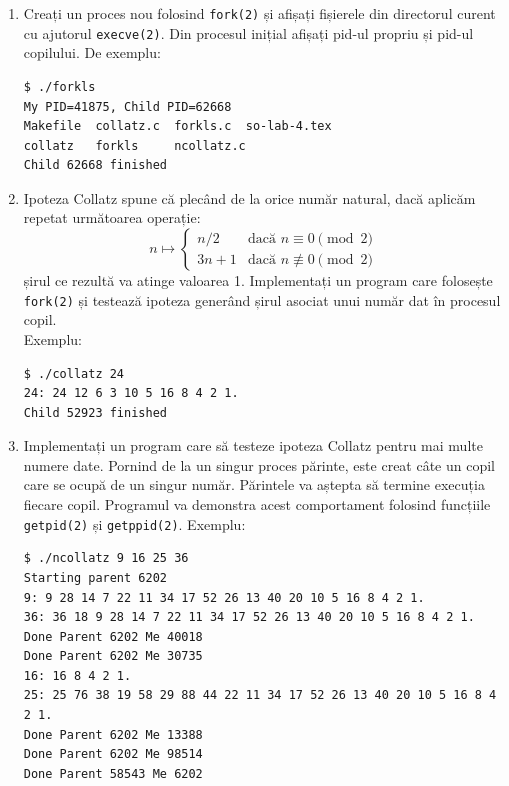 \documentclass[12pt,a4paper]{article}
\begin{document}
\begin{enumerate}

  \item Creați un proces nou folosind \texttt{fork(2)} 
  și afișați fișierele din directorul curent cu ajutorul \texttt{execve(2)}. 
  Din procesul inițial afișați pid-ul propriu și pid-ul copilului. 
  De exemplu:
\begin{lstlisting}[style=shell]
$ ./forkls
My PID=41875, Child PID=62668
Makefile  collatz.c  forkls.c  so-lab-4.tex
collatz   forkls     ncollatz.c
Child 62668 finished
\end{lstlisting}

  \item Ipoteza Collatz spune că plecând de la orice număr natural, 
  dacă aplicăm repetat următoarea operație:
    \[
      n \mapsto
      \begin{cases}
        n/2 & \text{dacă } n \equiv 0 \pmod{2} \\
        3n + 1 & \text{dacă } n \not\equiv 0 \pmod{2}
      \end{cases}
    \]
    șirul ce rezultă va atinge valoarea 1. 
    Implementați un program care folosește \texttt{fork(2)} 
    și testează ipoteza generând șirul asociat unui număr dat în procesul
    copil. \\

    Exemplu:
\begin{lstlisting}[style=shell]
$ ./collatz 24
24: 24 12 6 3 10 5 16 8 4 2 1.
Child 52923 finished
\end{lstlisting}

  \item Implementați un program care să testeze ipoteza Collatz 
  pentru mai multe numere date. 
  Pornind de la un singur proces părinte, 
  este creat câte un copil care se ocupă de un singur număr. 
  Părintele va aștepta să termine execuția fiecare copil. 
  Programul va demonstra acest comportament folosind funcțiile 
  \texttt{getpid(2)} și \texttt{getppid(2)}. 
  Exemplu:
\begin{lstlisting}[style=shell]
$ ./ncollatz 9 16 25 36
Starting parent 6202
9: 9 28 14 7 22 11 34 17 52 26 13 40 20 10 5 16 8 4 2 1.
36: 36 18 9 28 14 7 22 11 34 17 52 26 13 40 20 10 5 16 8 4 2 1.
Done Parent 6202 Me 40018
Done Parent 6202 Me 30735
16: 16 8 4 2 1.
25: 25 76 38 19 58 29 88 44 22 11 34 17 52 26 13 40 20 10 5 16 8 4 2 1.
Done Parent 6202 Me 13388
Done Parent 6202 Me 98514
Done Parent 58543 Me 6202
\end{lstlisting}

\end{enumerate}
\end{document}
